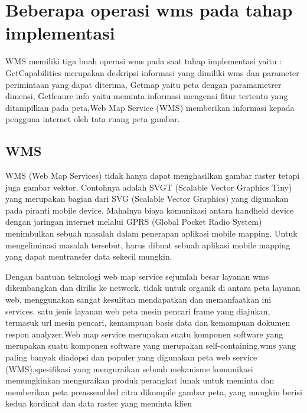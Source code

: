 \section{Beberapa operasi wms pada tahap implementasi}
WMS memiliki tiga buah operasi wms pada saat tahap implementasi yaitu : GetCapabilities merupakan deskripsi informasi yang dimiliki wms
dan parameter perimintaan yang dapat diterima, Getmap yaitu peta dengan paramametrer dimensi, Getfeaure info yaitu meminta informasi 
mengenai fitur tertentu yang ditampilkan pada peta,Web Map Service (WMS) memberikan informasi kepada pengguna internet oleh tata ruang peta gambar.

\subsection{WMS}
WMS (Web Map Services) tidak hanya dapat menghasilkan gambar raster tetapi juga gambar vektor. Contohnya  adalah SVGT (Scalable Vector
Graphics Tiny) yang merupakan bagian dari SVG (Scalable Vector Graphics) yang digunakan pada piranti mobile device. Mahalnya biaya
komunikasi antara handheld device dengan jaringan internet melalui GPRS (Global Pocket Radio System) menimbulkan sebuah masalah dalam
penerapan aplikasi mobile mapping. Untuk mengeliminasi masalah tersebut, harus dibuat sebuah aplikasi mobile mapping yang dapat mentransfer data sekecil mungkin.

Dengan bantuan teknologi web map service  sejumlah besar layanan wms dikembangkan dan dirilis ke network. tidak untuk organik di antara
peta layanan web, menggunakan sangat kesulitan mendapatkan dan memanfaatkan ini services. satu jenis layanan web peta mesin pencari
frame yang diajukan, termasuk url mesin pencari, kemampuan basis data dan kemampuan dokumen respon analyzer.Web map service merupakan suatu komponen software yang merupakan suatu komponen software yang merupakan self-containing.wms yang paling banyak  diadopsi dan populer yang digunakan peta web service (WMS),spesifikasi yang menguraikan sebuah mekanisme komunikasi memungkinkan menguraikan produk perangkat lunak untuk meminta dan memberikan peta preassembled citra dikompile gambar peta, yang mungkin berisi kedua kordinat dan data raster yang meminta klien




  
  
